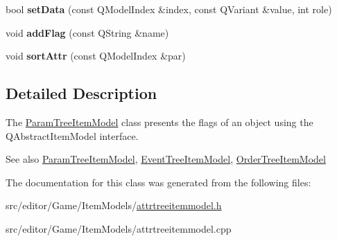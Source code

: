 \begin{DoxyCompactItemize}
\item 
\hypertarget{class_flag_tree_item_model_a574c890e9ccf9575b362d88d2bd7a36c}{bool {\bfseries set\-Data} (const \-Q\-Model\-Index \&index, const \-Q\-Variant \&value, int role)}\label{class_flag_tree_item_model_a574c890e9ccf9575b362d88d2bd7a36c}

\item 
\hypertarget{class_flag_tree_item_model_a51ff995bbfb7c54d608ec23205280211}{void {\bfseries add\-Flag} (const \-Q\-String \&name)}\label{class_flag_tree_item_model_a51ff995bbfb7c54d608ec23205280211}

\item 
\hypertarget{class_flag_tree_item_model_a41730252f38ebda9c249a615ab5b2af2}{void {\bfseries sort\-Attr} (const \-Q\-Model\-Index \&par)}\label{class_flag_tree_item_model_a41730252f38ebda9c249a615ab5b2af2}

\end{DoxyCompactItemize}


\subsection{\-Detailed \-Description}
\-The \hyperlink{class_param_tree_item_model}{\-Param\-Tree\-Item\-Model} class presents the flags of an object using the \-Q\-Abstract\-Item\-Model interface. 

\begin{DoxySeeAlso}{\-See also}
\hyperlink{class_param_tree_item_model}{\-Param\-Tree\-Item\-Model}, \hyperlink{class_event_tree_item_model}{\-Event\-Tree\-Item\-Model}, \hyperlink{class_order_tree_item_model}{\-Order\-Tree\-Item\-Model} 
\end{DoxySeeAlso}


\-The documentation for this class was generated from the following files\-:\begin{DoxyCompactItemize}
\item 
src/editor/\-Game/\-Item\-Models/\hyperlink{attrtreeitemmodel_8h}{attrtreeitemmodel.\-h}\item 
src/editor/\-Game/\-Item\-Models/attrtreeitemmodel.\-cpp\end{DoxyCompactItemize}
